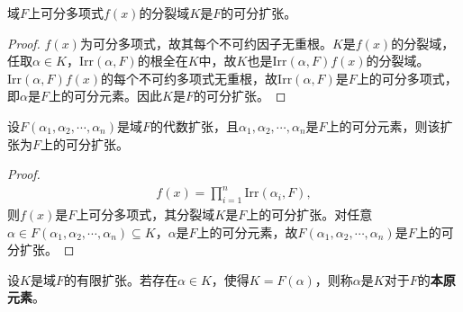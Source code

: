 \documentclass[../../main.tex]{subfiles}%
\begin{document}
\begin{theorem}
域$F$上可分多项式$f(x)$的分裂域$K$是$F$的可分扩张。
\end{theorem}
\begin{proof}

$f(x)$为可分多项式，故其每个不可约因子无重根。$K$是$f(x)$的分裂域，任取$\alpha\in K$，$\mathrm{Irr}(\alpha,F)$的根全在$K$中，故$K$也是$\mathrm{Irr}(\alpha,F)f(x)$的分裂域。$\mathrm{Irr}(\alpha,F)f(x)$的每个不可约多项式无重根，故$\mathrm{Irr}(\alpha,F)$是$F$上的可分多项式，即$\alpha$是$F$上的可分元素。因此$K$是$F$的可分扩张。

\end{proof}

\begin{corollary}
设$F(\alpha_1,\alpha_2,\cdots,\alpha_n)$是域$F$的代数扩张，且$\alpha_1,\alpha_2,\cdots,\alpha_n$是$F$上的可分元素，则该扩张为$F$上的可分扩张。
\end{corollary}
\begin{proof}

\begin{align*}
f(x)=\prod\limits_{i=1}^{n}\mathrm{Irr}(\alpha_i,F),
\end{align*}
则$f(x)$是$F$上可分多项式，其分裂域$K$是$F$上的可分扩张。对任意$\alpha\in F(\alpha_1,\alpha_2,\cdots,\alpha_n)\subseteq K$，$\alpha$是$F$上的可分元素，故$F(\alpha_1,\alpha_2,\cdots,\alpha_n)$是$F$上的可分扩张。

\end{proof}

\begin{definition}
设$K$是域$F$的有限扩张。若存在$\alpha\in K$，使得$K=F(\alpha)$，则称$\alpha$是$K$对于$F$的\textbf{本原元素}。
\end{definition}
\end{document}
